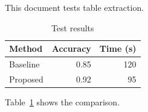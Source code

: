 \documentclass{article}
\begin{document}
This document tests table extraction.

\begin{table}[h]
\centering
\caption{Test results}
\label{tab:results}
\begin{tabular}{lrr}
\toprule
Method & Accuracy & Time (s) \\
\midrule
Baseline & 0.85 & 120 \\
Proposed & 0.92 & 95 \\
\bottomrule
\end{tabular}
\end{table}

Table~\ref{tab:results} shows the comparison.
\end{document}
